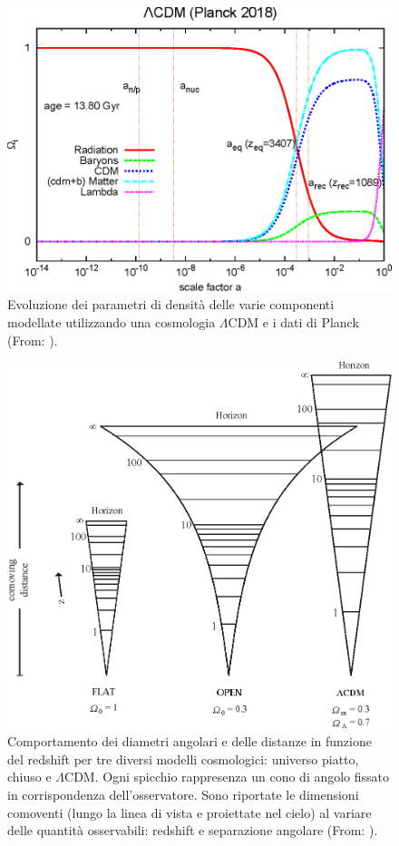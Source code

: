 \vspace{1em}
\begin{figure}[H]
    \centering
    \includegraphics[width=.85\textwidth]{Pictures/2/densparplank.eps}
    \caption{Evoluzione dei parametri di densità delle varie componenti modellate utilizzando una cosmologia $\Lambda$CDM e i dati di Planck (From: \cite{rindlerdaller2019understanding}).}
    \label{fig:2omeghe}
\end{figure}


\begin{figure}[ht]
    \centering
    \includegraphics[width=.95\textwidth]{Pictures/2/geometry.eps}
    \caption{Comportamento dei diametri angolari e delle distanze in funzione del redshift per tre diversi modelli cosmologici: universo piatto, chiuso e $\Lambda$CDM. Ogni spicchio rappresenza un cono di angolo fissato in corrispondenza dell'osservatore. Sono riportate le dimensioni comoventi (lungo la linea di vista e proiettate nel cielo) al variare delle quantità osservabili: redshift e separazione angolare (From: \cite{Hamilton_1998}).}
    \label{fig:2geom}
\end{figure}